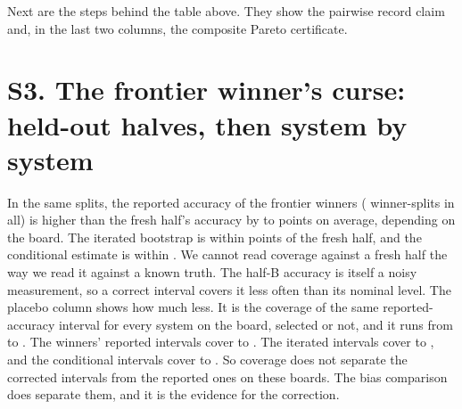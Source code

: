 \documentclass[10pt]{article}
\begin{document}
\medskip
Next are the steps behind the table above. They show the pairwise record claim and, in the last two columns, the composite Pareto certificate.


\section*{S3. The frontier winner's curse: held-out halves, then system by system}
\begin{table}[h]
\centering\small
\resizebox{\textwidth}{!}{}
\caption{The winner's curse on held-out halves of the HAL boards with at least 100 tasks, \NumHeldoutR{} random splits each. The table covers the frontier members of half A that have a cheaper rival (winners). For these, it shows the bias of the A-half reported accuracy and of the two corrected estimates, measured against the B-half accuracy. We shift this bias by the mean over all systems of the B-half minus A-half accuracy, so that the difference in difficulty between the halves cancels. It also shows the coverage of each 95\% interval. Placebo coverage: the coverage of the same reported-accuracy interval for every system on the board, selected or not.}
\label{tab:heldoutcurse}
\end{table}
In the same splits, the reported accuracy of the frontier winners (\NumHeldoutWinners{} winner-splits in all) is higher than the fresh half's accuracy by \NumHeldoutNaiveBiasMin{} to \NumHeldoutNaiveBiasMax{} points on average, depending on the board. The iterated bootstrap is within \NumHeldoutIterBiasAbsMax{} points of the fresh half, and the conditional estimate is within \NumHeldoutCondBiasAbsMax{}. We cannot read coverage against a fresh half the way we read it against a known truth. The half-B accuracy is itself a noisy measurement, so a correct interval covers it less often than its nominal level. The placebo column shows how much less. It is the coverage of the same reported-accuracy interval for every system on the board, selected or not, and it runs from \NumHeldoutPlaceboMin{} to \NumHeldoutPlaceboMax{}. The winners' reported intervals cover \NumHeldoutNaiveCovMin{} to \NumHeldoutNaiveCovMax{}. The iterated intervals cover \NumHeldoutIterCovMin{} to \NumHeldoutIterCovMax{}, and the conditional intervals cover \NumHeldoutCondCovMin{} to \NumHeldoutCondCovMax{}. So coverage does not separate the corrected intervals from the reported ones on these boards. The bias comparison does separate them, and it is the evidence for the correction.
\end{document}
